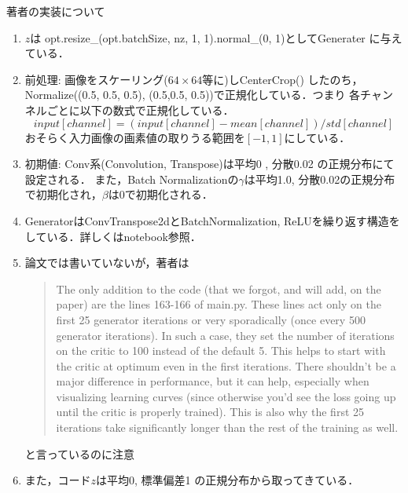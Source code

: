 \documentclass[uplatex, dvipdfmx]{jsarticle}
\theoremstyle{definition}
\begin{document}
    著者の実装について
    \begin{enumerate}
        \item $z$は opt.resize\_(opt.batchSize, nz, 1, 1).normal\_(0, 1)としてGenerater に与えている． 
        \item 前処理: 画像をスケーリング($64\times64$等に)しCenterCrop() したのち，Normalize((0.5, 0.5, 0.5), (0.5,0.5, 0.5))で正規化している．つまり
        各チャンネルごとに以下の数式で正規化している．
        \begin{equation}
            input[channel] = (input[channel] - mean[channel]) / std[channel]
        \end{equation}
        おそらく入力画像の画素値の取りうる範囲を$[-1, 1]$にしている．
        \item 初期値: Conv系(Convolution, Transpose)は平均0 , 分散0.02 の正規分布にて設定される． 
       また，Batch Normalizationの$\gamma$は平均1.0, 分散0.02の正規分布で初期化され，$\beta$は0で初期化される．

       \item GeneratorはConvTranspose2dとBatchNormalization, ReLUを繰り返す構造をしている．詳しくはnotebook参照．

       \item 論文では書いていないが，著者は
       \begin{quotation}
            The only addition to the code (that we forgot, and will add, on the paper) are the lines 163-166 of main.py.
            These lines act only on the first 25 generator iterations or very sporadically (once every 500 generator iterations).
            In such a case, they set the number of iterations on the critic to 100 instead of the default 5.
            This helps to start with the critic at optimum even in the first iterations. There shouldn't be a major difference in performance,
            but it can help, especially when visualizing learning curves (since otherwise you'd see the loss going up until the critic is properly trained).
            This is also why the first 25 iterations take significantly longer than the rest of the training as well.
        \end{quotation}
        と言っているのに注意

        \item また，コード$z$は平均0, 標準偏差1 の正規分布から取ってきている．
    \end{enumerate}
\end{document}
